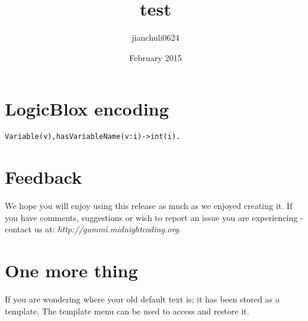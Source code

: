 \documentclass[11pt]{article}
\title{test}
\author{jianchuli0624 }
\date{February 2015}
\begin{document}
\section{LogicBlox encoding}
\begin{lstlisting}
Variable(v),hasVariableName(v:i)->int(i).
\end{lstlisting}
 

\section{Feedback}
We hope you will enjoy using this release as much as we enjoyed creating it. If you have comments, suggestions or wish to report an issue you are experiencing - contact us at: \emph{http://gummi.midnightcoding.org}.

\section{One more thing}
If you are wondering where your old default text is; it has been stored as a template. The template menu can be used to access and restore it. 
\end{document}
